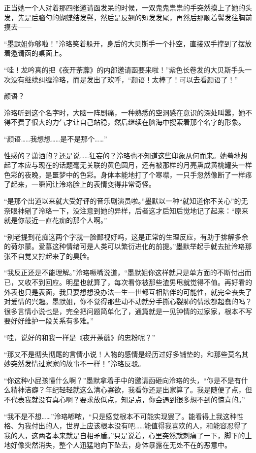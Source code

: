 \documentclass[UTF8, scheme = chinese, openany]{ctexbook}
\begin{document}
正当她一个人对着那四张邀请函发呆的时候，一双鬼鬼祟祟的手突然摸上了她的头发，先是后脑勺的蝴蝶结发髻，然后是反翘的短发发尾，再然后那顺着鬓发往胸前摸去——

“墨默姐你够啦！”泠珞笑着躲开，身后的大贝斯手一个扑空，直接双手撑到了摆放着邀请函的桌面上。

“哇！龙吟真的把《夜开荼蘼》的内部邀请函要来啦！”紫色长卷发的大贝斯手头一次没有继续纠缠泠珞，而是发出了欢呼，“颜语！太棒了！可以去看颜语了！”

颜语？

泠珞听到这个名字时，大脑一阵剧痛，一种熟悉的空洞感在意识的深处叫嚣，她不得不费了很大的力气才让自己站稳，然后继续在脑海中搜索着那个名字的形象。

“颜语……我想想……是不是那个……”

性感的？潇洒的？还是说……狂妄的？泠珞也不知道这些印象从何而来。她蓦地想起了本应与现在的话题毫无关联的黄色圆月，还有被那样的月亮熏成黄桃罐头一样色彩的夜晚，是噩梦中的色彩。身体本能地打了个寒噤，一只手忽然像断了一样疼了起来，一瞬间让泠珞脸上的表情变得非常奇怪。

“是那个出道以来就大受好评的音乐剧演员啦。”墨默以一种“就知道你不关心”的无奈眼神剜了泠珞一下，没注意到她的异样，后者这才后知后觉地记了起来：“原来就是你最近一直花痴的那个人啊。”

“别老提到花痴这两个字就一脸鄙视好吗，这是正常的生理反应，有助于排解多余的荷尔蒙。爱慕这种情绪可是人类可以繁衍进化的前提。”墨默举起手就去扯泠珞那张不自觉又拧起来了的臭脸。

“我反正还是不能理解。”泠珞噘嘴说道，“墨默姐你这样就只是单方面的不断付出而已，又收不到回应。明星也就算了，每次看你被那些渣男甩就觉得不值。再好看的外表也只是表面，我只要想想没办法一生一世都互相陪伴的可能性，就完全丧失了对爱情的兴趣。墨默姐，你不觉得那些动不动就分手撕心裂肺的情歌都超蠢的吗？很多言情小说也是，完全把问题简单化了，通篇就是一见钟情的过家家，根本不写要好好维护一段关系有多难。”

“哇，说好的和我一样是《夜开荼蘼》的忠粉呢？”

“那又不是彻头彻尾的言情小说！人物的感情是经历过好多铺垫的，和那些莫名其妙突然发情过家家的故事不一样！”泠珞反驳。

“你这种小屁孩懂什么啊？”墨默拿着手中的邀请函砸向泠珞的头，“你是不是有什么精神洁癖？年纪轻轻就这么清心寡欲，我看你还是出家算了。我是随便了点，但不代表我就没有真心啊？要求放低点，知足点，你会遇到很多想不到的惊喜的。”

“我不是不想……”泠珞嘟哝，“只是感觉根本不可能实现罢了。能看得上我这种性格、为我付出的人，世界上应该根本没有吧……能值得我喜欢的人，和能容忍得了我的人，这两者本来就是自相矛盾。”只是说着，心里突然就刺痛了一下，脚下的土地好像突然消失，整个人迅猛地向下坠去，身体暴露在无处不在的恶意中。
\end{document}
